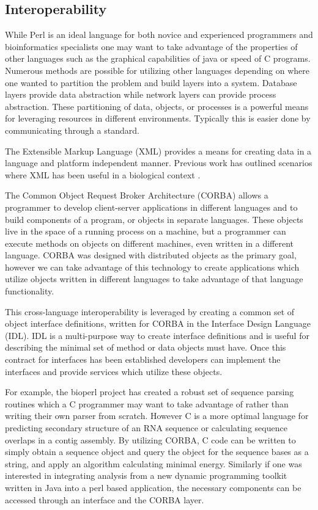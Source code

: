 \documentclass{article}
\begin{document}
\begin{twocolumn}
\section{Interoperability}


While Perl is an ideal language for both novice and experienced
programmers and bioinformatics specialists one may want to take
advantage of the properties of other languages such as the graphical
capabilities of java or speed of C programs.  Numerous methods are
possible for utilizing other languages depending on where one wanted
to partition the problem and build layers into a system.  Database
layers provide data abstraction while network layers can provide
process abstraction.  These partitioning of data, objects, or
processes is a powerful means for leveraging resources in different
environments.  Typically this is easier done by communicating through
a standard.  

The Extensible Markup Language (XML) provides a means for creating
data in a language and platform independent manner.  Previous work has
outlined scenarios where XML has been useful in a biological context
\cite{xml_bioinformatics}.  

The Common Object Request Broker Architecture (CORBA) allows a
programmer to develop client-server applications in different
languages and to build components of a program, or objects in separate
languages.  These objects live in the space of a running process on a
machine, but a programmer can execute methods on objects on different
machines, even written in a different language. CORBA was designed
with distributed objects as the primary goal, however we can take
advantage of this technology to create applications which utilize
objects written in different languages to take advantage of that
language functionality.

This cross-language interoperability is leveraged by creating a common
set of object interface definitions, written for CORBA in the
Interface Design Language (IDL).  IDL is a multi-purpose way to create
interface definitions and is useful for describing the minimal set of
method or data objects must have.  Once this contract for interfaces
has been established developers can implement the interfaces and
provide services which utilize these objects. 

For example, the bioperl project has created a robust set of sequence
parsing routines which a C programmer may want to take advantage of
rather than writing their own parser from scratch.  However C is a
more optimal language for predicting secondary structure of an RNA
sequence or calculating sequence overlaps in a contig assembly.  By
utilizing CORBA, C code can be written to simply obtain a sequence
object and query the object for the sequence bases as a string, and
apply an algorithm calculating minimal energy.  Similarly if one was
interested in integrating analysis from a new dynamic programming
toolkit written in Java into a perl based application, the necessary
components can be accessed through an interface and the CORBA layer.


\end{twocolumn}
\end{document}
